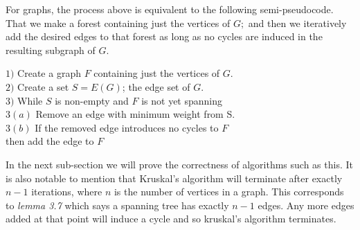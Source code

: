 \documentclass[../main.tex]{subfiles}
\begin{document}
For graphs, the process above is equivalent to the following semi-pseudocode. That we make a forest containing just the vertices of $G;$ and then we iteratively add the desired edges to that forest as long as no cycles are induced in the resulting subgraph of $G.$
\begin{algorithm}
$1)$ Create a graph $F$ containing just the vertices of $G.$\\
$2)$ Create a set $S = E(G)$; the edge set of $G.$ \\
$3)$ While $S$ is non-empty and $F$ is not yet spanning\\
\hspace{5mm} $3(a)$ Remove an edge with minimum weight from S.\\
\hspace{5mm} $3(b)$ If the removed edge introduces no cycles to $F$\\
\hspace{5mm} then add the edge to $F$\\
\end{algorithm}

In the next sub-section we will prove the correctness of algorithms such as this. It is also notable to mention that Kruskal's algorithm will terminate after exactly $n-1$ iterations, where $n$ is the number of vertices in a graph. This corresponds to \textit{lemma 3.7} which says a spanning tree has exactly $n-1$ edges. Any more edges added at that point will induce a cycle and so kruskal's algorithm terminates.
\end{document}
